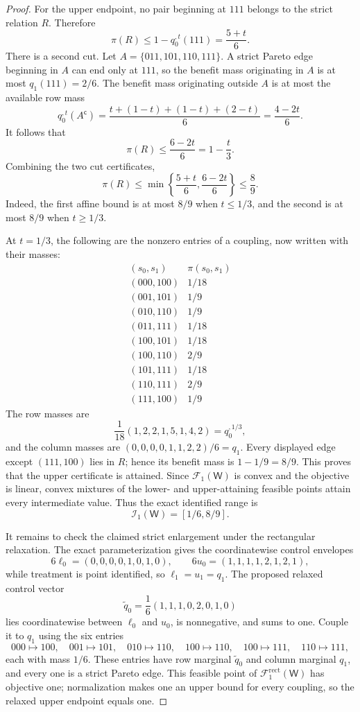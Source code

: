 \documentclass{article}
\begin{document}
\begin{proof}
For the upper endpoint, no pair beginning at \(111\) belongs to the strict relation \(R\).  Therefore
\[
\pi(R)\le1-q_0^{,t}(111)=\frac{5+t}{6}.
\]
There is a second cut.  Let \(A=\{011,101,110,111\}\).  A strict Pareto edge beginning in \(A\) can end only at \(111\), so the benefit mass originating in \(A\) is at most \(q_1(111)=2/6\).  The benefit mass originating outside \(A\) is at most the available row mass
\[
q_0^{,t}(A^{\mathsf c})
=\frac{t+(1-t)+(1-t)+(2-t)}6
=\frac{4-2t}{6}.
\]
It follows that
\[
\pi(R)\le\frac{6-2t}{6}=1-\frac{t}{3}.
\]
Combining the two cut certificates,
\[
\pi(R)\le
\min\!\left\{\frac{5+t}{6},\frac{6-2t}{6}\right\}
\le\frac89.
\]
Indeed, the first affine bound is at most \(8/9\) when \(t\le1/3\), and the second is at most \(8/9\) when \(t\ge1/3\).

At \(t=1/3\), the following are the nonzero entries of a coupling, now written with their masses:
\[
\begin{array}{c|c}
(s_0,s_1)&\pi(s_0,s_1)\\ \hline
(000,100)&1/18\\
(001,101)&1/9\\
(010,110)&1/9\\
(011,111)&1/18\\
(100,101)&1/18\\
(100,110)&2/9\\
(101,111)&1/18\\
(110,111)&2/9\\
(111,100)&1/9
\end{array}
\]
The row masses are
\[
\frac1{18}(1,2,2,1,5,1,4,2)=q_0^{,1/3},
\]
and the column masses are \((0,0,0,0,1,1,2,2)/6=q_1\).  Every displayed edge except \((111,100)\) lies in \(R\); hence its benefit mass is \(1-1/9=8/9\).  This proves that the upper certificate is attained.  Since \(\mathcal F_1(\mathsf W)\) is convex and the objective is linear, convex mixtures of the lower- and upper-attaining feasible points attain every intermediate value.  Thus the exact identified range is
\[
\mathcal I_1(\mathsf W)=[1/6,8/9].
\]

It remains to check the claimed strict enlargement under the rectangular relaxation.  The exact parameterization gives the coordinatewise control envelopes
\[
6\ell_0=(0,0,0,0,1,0,1,0),
\qquad
6u_0=(1,1,1,1,2,1,2,1),
\]
while treatment is point identified, so \(\ell_1=u_1=q_1\).  The proposed relaxed control vector
\[
\widetilde q_0=\frac16(1,1,1,0,2,0,1,0)
\]
lies coordinatewise between \(\ell_0\) and \(u_0\), is nonnegative, and sums to one.  Couple it to \(q_1\) using the six entries
\[
000\mapsto100,
\quad001\mapsto101,
\quad010\mapsto110,
\quad100\mapsto110,
\quad100\mapsto111,
\quad110\mapsto111,
\]
each with mass \(1/6\).  These entries have row marginal \(\widetilde q_0\) and column marginal \(q_1\), and every one is a strict Pareto edge.  This feasible point of \(\mathcal F^{\mathrm{rect}}_1(\mathsf W)\) has objective one; normalization makes one an upper bound for every coupling, so the relaxed upper endpoint equals one.


\end{proof}
\end{document}
